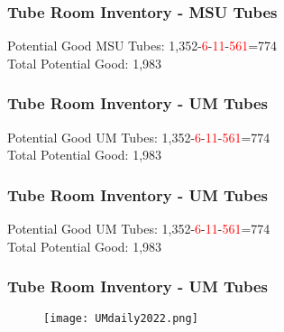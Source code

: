 \documentclass{beamer}
\begin{document}
\begin{frame}
	\frametitle{Tube Room Inventory - MSU Tubes}
	\begin{figure}
		\centering
		\scalebox{0.6}{}
	\end{figure}
	\centering
	Potential Good MSU Tubes: 1,352-\textcolor{red}{6}-\textcolor{red}{11}-\textcolor{red}{561}=774\\
	Total Potential Good: 1,983
\end{frame}
\begin{frame}
	\frametitle{Tube Room Inventory - UM Tubes}
		\scalebox{0.4}{}
	\centering
	Potential Good UM Tubes: 1,352-\textcolor{red}{6}-\textcolor{red}{11}-\textcolor{red}{561}=774\\
	Total Potential Good: 1,983
\end{frame}

\begin{frame}
	\frametitle{Tube Room Inventory - UM Tubes}
	\begin{figure}
		\centering
	\end{figure}
	\centering
	Potential Good UM Tubes: 1,352-\textcolor{red}{6}-\textcolor{red}{11}-\textcolor{red}{561}=774\\
	Total Potential Good: 1,983
\end{frame}

\begin{frame}
	\frametitle{Tube Room Inventory - UM Tubes}
	\begin{figure}
		\texttt{[image: UMdaily2022.png]}
	\end{figure}
\end{frame}
\end{document}
